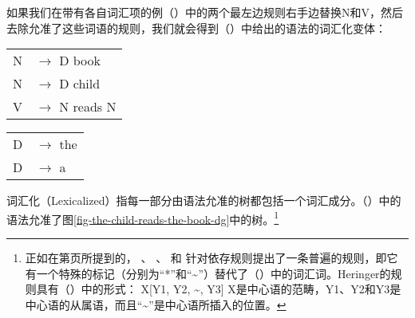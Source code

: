 \z
如果我们在带有各自词汇项的例（）中的两个最左边规则右手边替换N和V，然后去除允准了这些词语的规则，我们就会得到（）中给出的语法的词汇化变体：
\ea
\begin{tabular}[t]{@{}l@{ }l}
{N} & {$\to$ D book}\\          
{N} & {$\to$ D child}\\          
{V}  & {$\to$ N reads N}
\end{tabular}\hspace{1.5cm}%
\begin{tabular}[t]{@{}l@{ }l}
{D}  & {$\to$ the}\\
{D}  & {$\to$ a}\\
\end{tabular}
\z
词汇化（Lexicalized）指每一部分由语法允准的树都包括一个词汇成分。（）中的语法允准了图\ref{fig-the-child-reads-the-book-dg}中的树。\footnote{\label{fn-flat-dg-rules}%
正如在第\pageref{page-rule-format-dg}页所提到的， \citet[]{Gaifman65a}、 \citet[]{Hays64a-u}、 \citet[]{Baumgaertner70a}和 \citet[]{Heringer96a-u}针对依存规则提出了一条普遍的规则，即它有一个特殊的标记（分别为“*”和“\textasciitilde”）替代了（）中的词汇词。Heringer的规则具有（）中的形式：
\ea
X[Y1, Y2, \textasciitilde, Y3]
\z
X是中心语的范畴，Y1、Y2和Y3是中心语的从属语，而且“\textasciitilde”是中心语所插入的位置。
}

